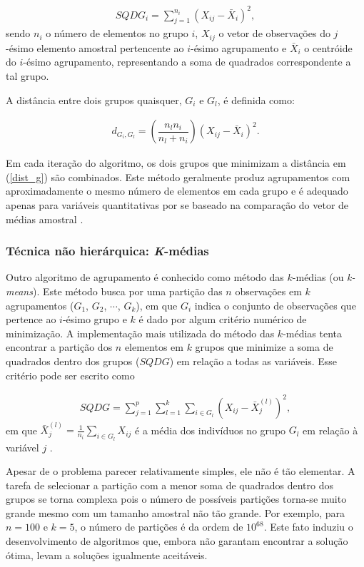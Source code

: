 \documentclass[
	12pt,				%
	openright,			%
	oneside,			%
	a4paper,			%
	chapter=TITLE,		%
	section=TITLE,		%
	english,			%
	french,				%
	spanish,			%
	brazil				%
	]{abntex2}
\begin{document}
\begin{align*}
SQDG_i = \sum_{j=1}^{n_i}(X_{ij} - \bar{X}_{i})^2,
\end{align*}
sendo $n_i$ o número de elementos no grupo $i$, $X_{ij}$ o vetor de observações do $j$-ésimo elemento amostral pertencente ao $i$-ésimo agrupamento e $\bar{X}_{i}$ o centróide do $i$-ésimo agrupamento, representando a soma de quadrados correspondente a tal grupo.

A distância entre dois grupos quaisquer, $G_i$ e $G_l$, é definida como:

\begin{align}\label{dist_g}
d_{ G_i,G_l} = \left(\dfrac{n_l n_i}{n_l + n_i}\right)(X_{ij} - \bar{X}_{i})^2.		
\end{align}

Em cada iteração do algoritmo, os dois grupos que minimizam a distância em (\ref{dist_g}) são combinados. Este método geralmente produz agrupamentos com aproximadamente o mesmo número de elementos em cada grupo e é adequado apenas para variáveis quantitativas por se baseado na comparação do vetor de médias amostral \cite{mingoti10}. 

\subsubsection{Técnica não hierárquica: \textit{K}-médias}

Outro algoritmo de agrupamento é conhecido como método das $k$-médias (ou \textit{k-means}). Este método busca por uma partição das $n$ observações em $k$ agrupamentos ($G_1$, $G_2$, $\cdots$, $G_k$), em que $G_i$ indica o conjunto de observações que pertence ao $i$-ésimo grupo e $k$ é dado por algum critério numérico de minimização. A implementação mais utilizada do método das $k$-médias tenta encontrar a partição dos $n$ elementos em $k$ grupos que minimize a soma de quadrados dentro dos grupos ($SQDG$) em relação a todas as variáveis. Esse critério pode ser escrito como 

\begin{align*}
SQDG = \sum_{j=1}^{p}\sum_{l=1}^{k}\sum_{i \in G_l}(X_{ij} - \bar{X}_{j}^{(l)})^2,
\end{align*}
em que $\bar{X}_{j}^{(l)} = \displaystyle\frac{1}{n_i}\sum_{i \in G_l}X_{ij}$ é a média dos indivíduos no grupo $G_l$ em relação à variável $j$ \cite{everitt11}.

Apesar de o problema parecer relativamente simples, ele não é tão elementar. A tarefa de selecionar a partição com a menor soma de quadrados dentro dos grupos se torna complexa pois o número de possíveis partições torna-se muito grande mesmo com um tamanho amostral não tão grande. Por exemplo, para $n = 100$ e $k=5$, o número de partições é da ordem de $10^{68}$. Este fato induziu o desenvolvimento de algoritmos que, embora não garantam encontrar a solução ótima, levam a soluções igualmente aceitáveis.
\end{document}
